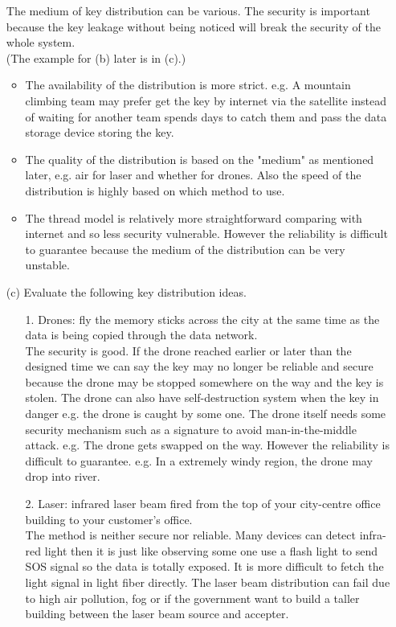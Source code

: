 \documentclass[10pt,twoside,a4paper]{article}
\begin{document}
\begin{itemize}
The medium of key distribution can be various. The security is important because the key leakage without being noticed will break the security of the whole system. 
\\(The example for (b) later is in (c).)
\begin{itemize}
\item The availability of the distribution is more strict. e.g. A mountain climbing team may prefer get the key by internet via the satellite instead of waiting for another team spends days to catch them and pass the data storage device storing the key. 
\item The quality of the distribution is based on the "medium" as mentioned later, e.g. air for laser and whether for drones. Also the speed of the distribution is highly based on which method to use. 
\item The thread model is relatively more straightforward comparing with internet and so less security vulnerable. However the reliability is difficult to guarantee because the medium of the distribution can be very unstable. 
\end{itemize}
\item[(c)] Evaluate the following key distribution ideas.
\begin{itemize}
\item[1.] Drones: fly the memory sticks across the city at the same time as the data is being copied through the data network.\\
The security is good. If the drone reached earlier or later than the designed time we can say the key may no longer be reliable and secure because the drone may be stopped somewhere on the way and the key is stolen. The drone can also have self-destruction system when the key in danger e.g. the drone is caught by some one. The drone itself needs some security mechanism such as a signature to avoid man-in-the-middle attack. e.g. The drone gets swapped on the way. However the reliability is difficult to guarantee. e.g. In a extremely windy region, the drone may drop into river.
\item[2.] Laser: infrared laser beam fired from the top of your city-centre office building to your customer's office.\\
The method is neither secure nor reliable. Many devices can detect infra-red light then it is just like observing some one use a flash light to send SOS signal so the data is totally exposed. It is more difficult to fetch the light signal in light fiber directly. The laser beam distribution can fail due to high air pollution, fog or if the government want to build a taller building between the laser beam source and accepter. 

\end{itemize}
\end{itemize}
\end{document}
